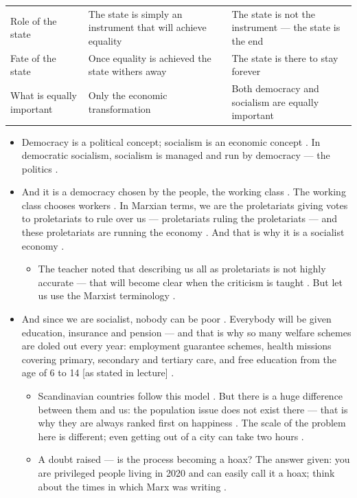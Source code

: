 \begin{table}[h!]
\centering
\begin{tabularx}{\textwidth}{lYY}
\toprule
{}
\thead{} &  &  \\
\midrule
Role of the state & The state is simply an instrument that will achieve equality & The state is not the instrument --- the state is the end \\
Fate of the state & Once equality is achieved the state withers away & The state is there to stay forever \\
What is equally important & Only the economic transformation & Both democracy and socialism are equally important \\
\bottomrule
\end{tabularx}
\end{table}

\begin{itemize}
    \item Democracy is a political concept; socialism is an economic concept . In democratic socialism, socialism is managed and run by democracy --- the politics .
    \item And it is a democracy chosen by the people, the working class . The working class chooses workers . In Marxian terms, we are the proletariats giving votes to proletariats to rule over us --- proletariats ruling the proletariats --- and these proletariats are running the economy . And that is why it is a socialist economy .
    \begin{itemize}
        \item The teacher noted that describing us all as proletariats is not highly accurate --- that will become clear when the criticism is taught . But let us use the Marxist terminology .
    \end{itemize}
    \item And since we are socialist, nobody can be poor . Everybody will be given education, insurance and pension --- and that is why so many welfare schemes are doled out every year: employment guarantee schemes, health missions covering primary, secondary and tertiary care, and free education from the age of 6 to 14 [as stated in lecture] .
    \begin{itemize}
        \item Scandinavian countries follow this model . But there is a huge difference between them and us: the population issue does not exist there --- that is why they are always ranked first on happiness . The scale of the problem here is different; even getting out of a city can take two hours .
        \item A doubt raised --- is the process becoming a hoax? The answer given: you are privileged people living in 2020 and can easily call it a hoax; think about the times in which Marx was writing .
    \end{itemize}
\end{itemize}

